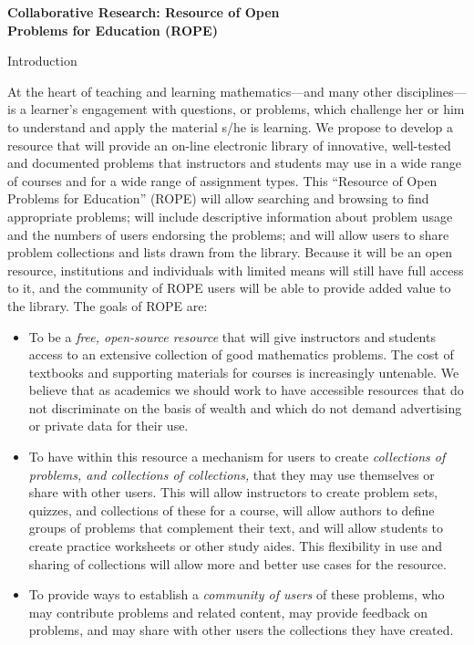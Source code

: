 \documentclass[11pt]{article}
\begin{document}
\begin{center}
{\Large \textbf{Collaborative Research: Resource of Open\\
Problems for Education (ROPE)}}
\end{center}

\begin{section}{Introduction}

At the heart of teaching and learning mathematics---and many other
disciplines---is a learner's engagement with questions, or problems, which
challenge her or him to understand and apply the material s/he is
learning.  We propose to develop a resource that will provide an on-line
electronic library of innovative, well-tested and documented problems that
instructors and students may use in a wide range of courses and for a wide
range of assignment types.  This ``Resource of Open Problems for
Education'' (ROPE) will allow searching and browsing to find appropriate
problems; will include descriptive information about problem usage and the
numbers of users endorsing the problems; and will allow users to share
problem collections and lists drawn from the library.  Because it will be
an open resource, institutions and individuals with limited means will
still have full access to it, and the community of ROPE users will be able
to provide added value to the library.  The goals of ROPE are:
\begin{itemize}
  \item
    To be a \textit{free, open-source resource} that will give instructors
    and students access to an extensive collection of good mathematics
    problems.  The cost of textbooks and supporting materials for courses
    is increasingly untenable.  We believe that as academics
    we should work to have accessible resources that do not
    discriminate on the basis of wealth and which do not demand
    advertising or private data for their use.
  \item
    To have within this resource a mechanism for users to create
    \textit{collections of problems, and collections of collections,} 
    that they may use themselves or share with other users.
    This will allow instructors to create problem sets, quizzes, and
    collections of these for a course, will allow authors to define groups
    of problems that complement their text, and will allow students to create practice
    worksheets or other study aides.  This flexibility in use and
    sharing of collections will allow more and better use cases for the
    resource. 
  \item
    To provide ways to establish a \textit{community of users} of these
    problems, who may contribute problems and related content, may provide
    feedback on problems, and may share with other users the collections
    they have created.
\end{itemize}

\end{section}
\end{document}
